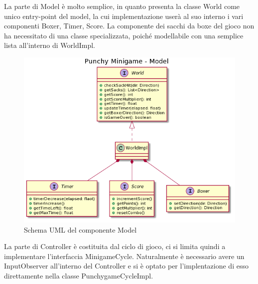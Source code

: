 \documentclass[a4paper,12pt]{report}
\begin{document}
	La parte di Model è molto semplice, in quanto presenta la classe World come unico entry-point del model, la cui implementazione userà al suo interno i vari componenti Boxer, Timer, Score. La componente dei sacchi da boxe del gioco non ha necessitato di una classe specializzata, poiché modellabile con una semplice lista all'interno di WorldImpl.\newline
    \begin{figure}[!t]
        \centering{}
        \includegraphics[width=150mm]{images/picchiotti/punchymodel.png}
        \caption{Schema UML del componente Model}
        \label{img:punchymodel}
    \end{figure}
	La parte di Controller è costituita dal ciclo di gioco, ci si limita quindi a implementare l'interfaccia MinigameCycle.
    Naturalmente è necessario avere un InputObserver all'interno del Controller e si è optato per l'implentazione di esso direttamente nella classe PunchygameCycleImpl.
\end{document}
